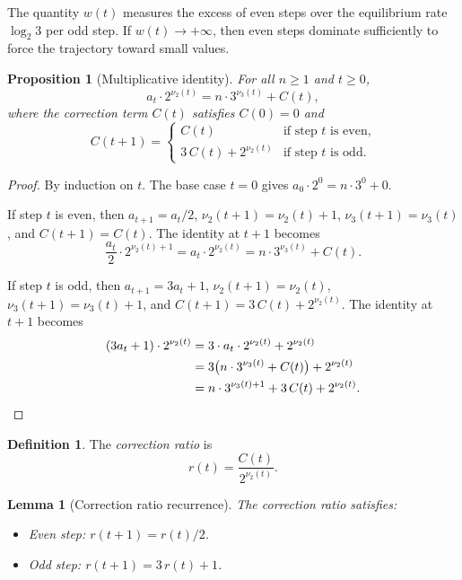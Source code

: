 \documentclass[manuscript]{aomart}
\theoremstyle{plain}
\newtheorem{proposition}[theorem]{Proposition}
\newtheorem{lemma}[theorem]{Lemma}
\theoremstyle{definition}
\newtheorem{definition}[theorem]{Definition}
\theoremstyle{remark}
\numberwithin{equation}{section}
\begin{document}
The quantity $w(t)$ measures the excess of even steps over the
equilibrium rate $\log_2 3$ per odd step.  If $w(t) \to +\infty$,
then even steps dominate sufficiently to force the trajectory toward
small values.

\begin{proposition}[Multiplicative identity]\label{prop:identity}
For all $n \ge 1$ and $t \ge 0$,
\begin{equation}\label{eq:identity}
  a_t \cdot 2^{\nu_2(t)} = n \cdot 3^{\nu_3(t)} + C(t),
\end{equation}
where the \emph{correction term} $C(t)$ satisfies $C(0) = 0$ and
\begin{equation}\label{eq:C-recurrence}
  C(t+1) =
  \begin{cases}
    C(t) & \text{if step } t \text{ is even,}\\
    3\,C(t) + 2^{\nu_2(t)} & \text{if step } t \text{ is odd.}
  \end{cases}
\end{equation}
\end{proposition}

\begin{proof}
By induction on $t$.  The base case $t = 0$ gives
$a_0 \cdot 2^0 = n \cdot 3^0 + 0$.

If step $t$ is even, then $a_{t+1} = a_t/2$,
$\nu_2(t{+}1) = \nu_2(t) + 1$, $\nu_3(t{+}1) = \nu_3(t)$, and
$C(t{+}1) = C(t)$.  The identity at $t{+}1$ becomes
\[
  \frac{a_t}{2} \cdot 2^{\nu_2(t)+1}
  = a_t \cdot 2^{\nu_2(t)}
  = n \cdot 3^{\nu_3(t)} + C(t).
\]

If step $t$ is odd, then $a_{t+1} = 3a_t + 1$,
$\nu_2(t{+}1) = \nu_2(t)$, $\nu_3(t{+}1) = \nu_3(t) + 1$, and
$C(t{+}1) = 3\,C(t) + 2^{\nu_2(t)}$.  The identity at $t{+}1$ becomes
\begin{align*}
  (3a_t + 1) \cdot 2^{\nu_2(t)}
  &= 3 \cdot a_t \cdot 2^{\nu_2(t)} + 2^{\nu_2(t)} \\
  &= 3\bigl(n \cdot 3^{\nu_3(t)} + C(t)\bigr) + 2^{\nu_2(t)} \\
  &= n \cdot 3^{\nu_3(t)+1} + 3\,C(t) + 2^{\nu_2(t)}. \qedhere
\end{align*}
\end{proof}

\begin{definition}\label{def:correction-ratio}
The \emph{correction ratio} is
\[
  r(t) = \frac{C(t)}{2^{\nu_2(t)}}.
\]
\end{definition}

\begin{lemma}[Correction ratio recurrence]\label{lem:r-recurrence}
The correction ratio satisfies:
\begin{itemize}
  \item Even step: $r(t{+}1) = r(t)/2$.
  \item Odd step: $r(t{+}1) = 3\,r(t) + 1$.
\end{itemize}
\end{lemma}
\end{document}
